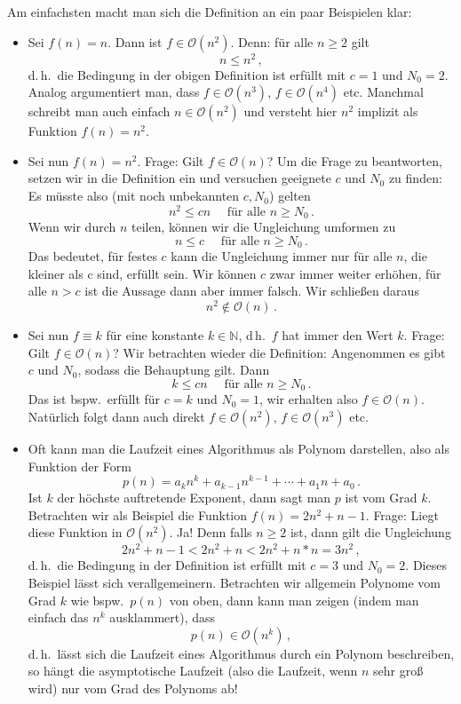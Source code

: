 \documentclass[fontsize=12pt,paper=14,div=calc,parskip=full]{scrartcl}
\def\N{\mathbb{N}}
\begin{document}
Am einfachsten macht man sich die Definition an ein paar Beispielen
klar:
\begin{itemize}
\item Sei $f(n) = n$. Dann ist $f \in \mathcal{O}(n^2)$. Denn: für
  alle $n \ge 2$ gilt
  \[
    n \le n^2\,,
  \]
  d.\,h.\, die Bedingung in der obigen Definition ist erfüllt mit
  $c = 1$ und $N_0 = 2$. Analog argumentiert man, dass
  $f \in \mathcal{O}(n^3)$, $f \in \mathcal{O}(n^4)$ etc. Manchmal
  schreibt man auch einfach $n \in \mathcal{O}(n^2)$ und versteht hier
  $n^2$ implizit als Funktion $f(n) = n^2$.

\item Sei nun $f(n) = n^2$. Frage: Gilt $f \in \mathcal{O}(n)$? Um die
  Frage zu beantworten, setzen wir in die Definition ein und versuchen
  geeignete $c$ und $N_0$ zu finden: Es müsste also (mit noch
  unbekannten $c, N_0$) gelten
  \[
    n^2 \le c n \quad \text{ für alle } n \ge N_0 \,.
  \]
  Wenn wir durch $n$ teilen, können wir die Ungleichung umformen zu
  \[
    n \le c \quad \text{ für alle } n \ge N_0 \,.
  \]
  Das bedeutet, für festes $c$ kann die Ungleichung immer nur für alle
  $n$, die kleiner als c sind, erfüllt sein. Wir können $c$ zwar immer
  weiter erhöhen, für alle $n > c$ ist die Aussage dann aber immer
  falsch. Wir schließen daraus
  \[
    n^2 \not\in \mathcal{O}(n)\,.
  \]
\item Sei nun $f \equiv k$ für eine konstante $k \in \N$, d\,h.\ $f$
  hat immer den Wert $k$.  Frage: Gilt $f \in \mathcal{O}(n)$?  Wir
  betrachten wieder die Definition: Angenommen es gibt $c$ und $N_0$,
  sodass die Behauptung gilt. Dann
  \[
    k \le c n \quad \text{ für alle } n \ge N_0 \,.
  \]
  Das ist bspw.\, erfüllt für $c = k$ und $N_0 = 1$, wir erhalten also
  $f \in \mathcal{O}(n)$. Natürlich folgt dann auch direkt
  $f \in \mathcal{O}(n^2)$, $f \in \mathcal{O}(n^3)$ etc.

\item Oft kann man die Laufzeit eines Algorithmus als Polynom
  darstellen, also als Funktion der Form
  \[
    p(n) = a_k n^k + a_{k-1} n^{k-1} + \dotsm + a_1 n + a_0 \,.
  \]
  Ist $k$ der höchste auftretende Exponent, dann sagt man $p$ ist vom
  Grad $k$.  Betrachten wir als Beispiel die Funktion
  $f(n) = 2n^2 + n - 1$. Frage: Liegt diese Funktion in
  $\mathcal{O}(n^2)$. Ja! Denn falls $n \ge 2$ ist, dann gilt die
  Ungleichung
  \[
    2n^2 + n - 1 < 2n^2 + n < 2n^2 + n * n = 3n^2\,,
  \]
  d.\,h.\ die Bedingung in der Definition ist erfüllt mit $c = 3$ und
  $N_0 = 2$. Dieses Beispiel lässt sich verallgemeinern. Betrachten
  wir allgemein Polynome vom Grad $k$ wie bspw.\ $p(n)$ von oben, dann
  kann man zeigen (indem man einfach das $n^k$ ausklammert), dass
  \[
    p(n) \in \mathcal{O}(n^k)\,,
  \]
  d.\,h.\ lässt sich die Laufzeit eines Algorithmus durch ein Polynom
  beschreiben, so hängt die asymptotische Laufzeit (also die Laufzeit,
  wenn $n$ sehr groß wird) nur vom Grad des Polynoms ab!
\end{itemize}
\end{document}
